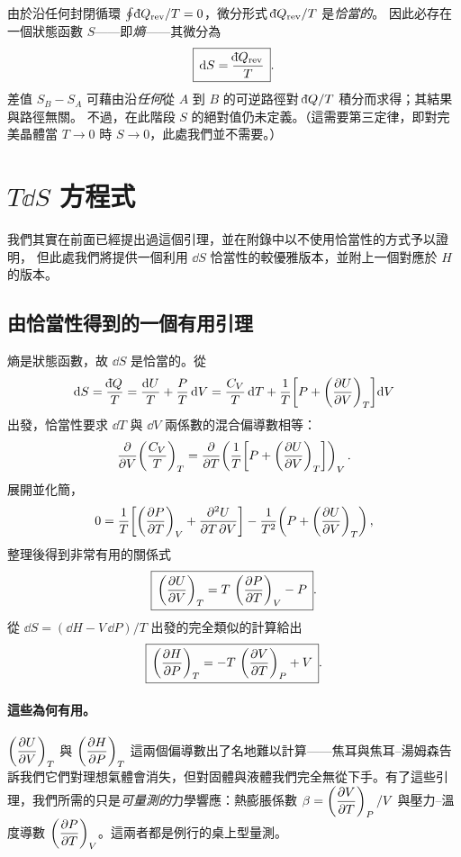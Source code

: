 由於沿任何封閉循環 $\oint \dbar Q_{\text{rev}}/T = 0$，微分形式 $\dbar Q_{\text{rev}}/T$ 是\emph{恰當的}。
因此必存在一個狀態函數 $S$——即\emph{熵}——其微分為
\[
    \boxed{\,\dd S = \frac{\dbar Q_{\text{rev}}}{T}\,}.
\]
差值 $S_B - S_A$ 可藉由沿\emph{任何}從 $A$ 到 $B$ 的可逆路徑對 $\dbar Q/T$ 積分而求得；其結果與路徑無關。
不過，在此階段 $S$ 的絕對值仍未定義。（這需要第三定律，即對完美晶體當 $T \to 0$ 時 $S \to 0$，此處我們並不需要。）

\section{$T\dd S$ 方程式}
我們其實在前面已經提出過這個引理，並在附錄中以不使用恰當性的方式予以證明，
但此處我們將提供一個利用 $\dd S$ 恰當性的較優雅版本，並附上一個對應於 $H$ 的版本。
\subsection{由恰當性得到的一個有用引理}

熵是狀態函數，故 $\dd S$ 是恰當的。從
\[
    \dd S = \frac{\dbar Q}{T} = \frac{\dd U}{T} + \frac{P}{T}\,\dd V
          = \frac{C_V}{T}\,\dd T + \frac{1}{T}\!\left[P + \pa{U}{V}_T\right]\!\dd V
\]
出發，恰當性要求 $\dd T$ 與 $\dd V$ 兩係數的混合偏導數相等：
\[
    \dfrac{\partial }{\partial V}\!\left(\frac{C_V}{T}\right)_T = \dfrac{\partial }{\partial T}\!\left(\frac{1}{T}\!\left[P + \left(\dfrac{\partial U}{\partial V}\right)_T\right]\right)_V.
\]
展開並化簡，
\[
    0 = \frac{1}{T}\!\left[\left(\dfrac{\partial P}{\partial T}\right)_V + \dfrac{\partial ^{2}U}{\partial T\,\partial V}\right] - \frac{1}{T^{2}}\!\left(P + \left(\dfrac{\partial U}{\partial V}\right)_T\right),
\]
整理後得到非常有用的關係式
\[
    \boxed{\,\left(\dfrac{\partial U}{\partial V}\right)_T = T\,\left(\dfrac{\partial P}{\partial T}\right)_V - P\,}.
\]
從 $\dd S = (\dd H - V\,\dd P)/T$ 出發的完全類似的計算給出
\[
    \boxed{\,\left(\dfrac{\partial H}{\partial P}\right)_T = -T\,\left(\dfrac{\partial V}{\partial T}\right)_P + V\,}.
\]

\paragraph{這些為何有用。}
$\left(\dfrac{\partial U}{\partial V}\right)_T$ 與 $\left(\dfrac{\partial H}{\partial P}\right)_T$ 這兩個偏導數出了名地難以計算——焦耳與焦耳--湯姆森告訴我們它們對理想氣體會消失，但對固體與液體我們完全無從下手。有了這些引理，我們所需的只是\emph{可量測的}力學響應：熱膨脹係數 $\beta = \left(\dfrac{\partial V}{\partial T}\right)_P/V$ 與壓力--溫度導數 $\left(\dfrac{\partial P}{\partial T}\right)_V$。這兩者都是例行的桌上型量測。

